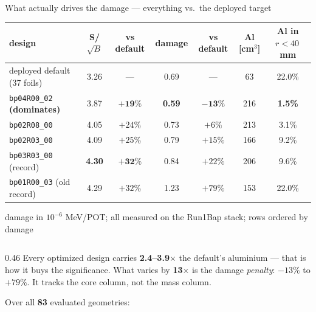 \documentclass[aspectratio=169,10pt]{beamer}
\begin{document}
\begin{frame}{What actually drives the damage --- everything vs.\ the deployed target}
\vspace{-0.2em}
\begin{center}
\scriptsize
\setlength{\tabcolsep}{4pt}
\begin{tabular}{@{}lcccccc@{}}
\toprule
design & S/$\sqrt{B}$ & \textbf{vs default} & damage & \textbf{vs default}
       & Al [cm$^3$] & Al in $r<40$\,mm \\
\midrule
deployed default (37 foils) & 3.26 & --- & 0.69 & --- & 63 & 22.0\% \\
\midrule
\rowcolor{green!12}
\texttt{bp04R00\_02} \textbf{(dominates)} & 3.87 & $\mathbf{+19\%}$ & \textbf{0.59}
                                  & $\mathbf{-13\%}$ & 216 & \textbf{1.5\%} \\
\texttt{bp02R08\_00}              & 4.05 & $+24\%$ & 0.73 & $+6\%$ & 213 & 3.1\% \\
\texttt{bp02R03\_00}              & 4.09 & $+25\%$ & 0.79 & $+15\%$ & 166 & 9.2\% \\
\texttt{bp03R03\_00} (record)     & \textbf{4.30} & $\mathbf{+32\%}$ & 0.84 & $+22\%$ & 206 & 9.6\% \\
\texttt{bp01R00\_03} (old record) & 4.29 & $+32\%$ & 1.23 & $+79\%$ & 153 & 22.0\% \\
\bottomrule
\end{tabular}

{\tiny damage in $10^{-6}$ MeV/POT; all measured on the Run1Bap stack; rows ordered by damage}
\end{center}
\vspace{0.3em}
\begin{columns}[T]
\begin{column}{0.46\textwidth}
\scriptsize
Every optimized design carries \textbf{2.4--3.9$\times$} the default's aluminium --- that is
how it buys the significance. What varies by \textbf{13$\times$} is the damage \emph{penalty}:
$-13\%$ to $+79\%$. It tracks the core column, not the mass column.
\vspace{0.4em}

Over all \textbf{83} evaluated geometries:


\end{column}
\end{columns}
\end{frame}
\end{document}
